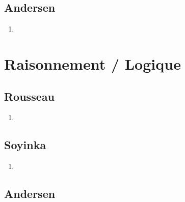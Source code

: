 \documentclass[a4paper, 11pt, hidelinks]{article}
\begin{document}
\subsection{Andersen}


\begin{enumerate}
    \item 
\end{enumerate}














































\section{Raisonnement / Logique}



\subsection{Rousseau}


\begin{enumerate}
    \item 
\end{enumerate}



\subsection{Soyinka}


\begin{enumerate}
    \item 
\end{enumerate}




\subsection{Andersen}
\end{document}
